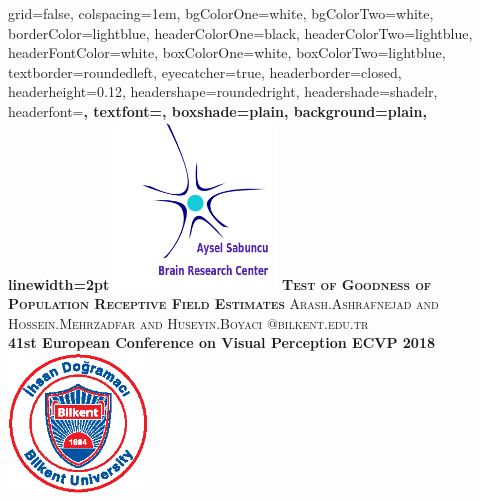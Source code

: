 \documentclass[portrait,final,a0paper,fontscale=0.277]{baposter}
\begin{document}
\begin{poster}%
  {
  grid=false,
  colspacing=1em,
  bgColorOne=white,
  bgColorTwo=white,
  borderColor=lightblue,
  headerColorOne=black,
  headerColorTwo=lightblue,
  headerFontColor=white,
  boxColorOne=white,
  boxColorTwo=lightblue,
  textborder=roundedleft,
  eyecatcher=true,
  headerborder=closed,
  headerheight=0.12\textheight,
  headershape=roundedright,
  headershade=shadelr,
  headerfont=\Large\bf\textsc, %
  textfont={\setlength{\parindent}{1.5em}},
  boxshade=plain,
  background=plain,
  linewidth=2pt
  }
  {\includegraphics[height=12.0em]{images/BAM.png}} 
  {\bf\textsc{Test of Goodness of Population Receptive Field Estimates}\vspace{0.3em}}
  {\textsc{ Arash.Ashrafnejad and Hossein.Mehrzadfar and Huseyin.Boyaci @bilkent.edu.tr}\\
  \vspace{1em}
  \bf41st European Conference on Visual Perception ECVP 2018}
  {%
    \includegraphics[height=10.0em]{images/bilkent.eps}
  }


\end{poster}
\end{document}
